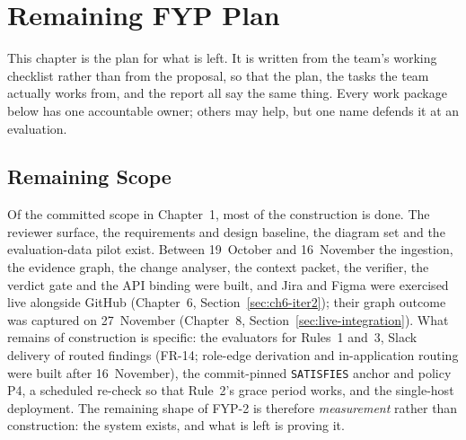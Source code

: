 \chapter{Remaining FYP Plan}
\label{ch:fyp2plan}

This chapter is the plan for what is left. It is written from the team's
working checklist rather than from the proposal, so that the plan, the tasks the
team actually works from, and the report all say the same thing. Every work
package below has one accountable owner; others may help, but one name defends
it at an evaluation.

\section{Remaining Scope}
\label{sec:remaining-scope}

Of the committed scope in Chapter~1, most of the construction is done. The
reviewer surface, the requirements and design baseline, the diagram set and the
evaluation-data pilot exist. Between 19~October and 16~November the ingestion,
the evidence graph, the change analyser, the context packet, the verifier, the
verdict gate and the API binding were built, and Jira and Figma were exercised
live alongside GitHub (Chapter~6, Section~\ref{sec:ch6-iter2}); their graph
outcome was captured on 27~November (Chapter~8,
Section~\ref{sec:live-integration}). What remains of construction is specific: the evaluators for Rules~1 and~3, Slack
delivery of routed findings (FR-14; role-edge derivation and in-application
routing were built after 16~November), the commit-pinned \texttt{SATISFIES}
anchor and policy P4, a scheduled re-check so that Rule~2's grace period works,
and the single-host deployment. The remaining shape of FYP-2 is therefore
\emph{measurement} rather than construction: the system exists, and what is left
is proving it.


